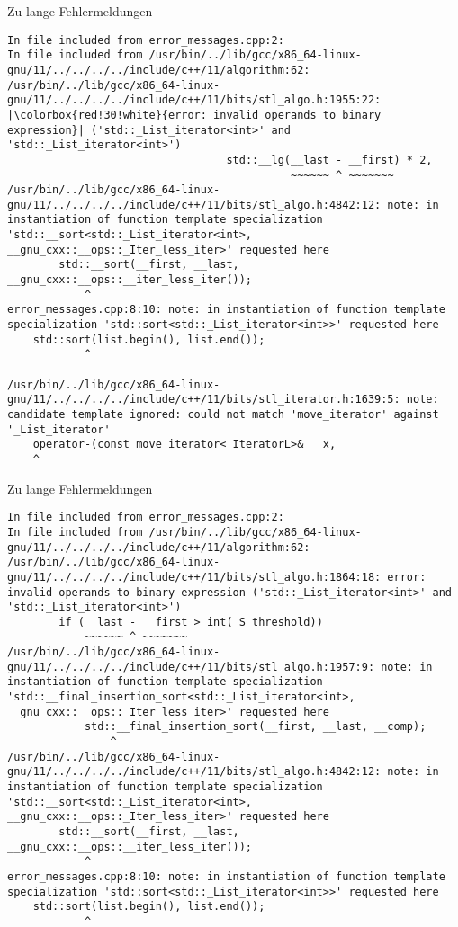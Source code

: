 \setlength{\fboxsep}{0.1pt}
\begin{frame}[fragile]{Zu lange Fehlermeldungen}
    \begin{verbatim}
In file included from error_messages.cpp:2:
In file included from /usr/bin/../lib/gcc/x86_64-linux-gnu/11/../../../../include/c++/11/algorithm:62:
/usr/bin/../lib/gcc/x86_64-linux-gnu/11/../../../../include/c++/11/bits/stl_algo.h:1955:22:
|\colorbox{red!30!white}{error: invalid operands to binary expression}| ('std::_List_iterator<int>' and 'std::_List_iterator<int>')
                                  std::__lg(__last - __first) * 2,
                                            ~~~~~~ ^ ~~~~~~~
/usr/bin/../lib/gcc/x86_64-linux-gnu/11/../../../../include/c++/11/bits/stl_algo.h:4842:12: note: in instantiation of function template specialization 'std::__sort<std::_List_iterator<int>, __gnu_cxx::__ops::_Iter_less_iter>' requested here
        std::__sort(__first, __last, __gnu_cxx::__ops::__iter_less_iter());
            ^
error_messages.cpp:8:10: note: in instantiation of function template specialization 'std::sort<std::_List_iterator<int>>' requested here
    std::sort(list.begin(), list.end());
            ^

/usr/bin/../lib/gcc/x86_64-linux-gnu/11/../../../../include/c++/11/bits/stl_iterator.h:1639:5: note: candidate template ignored: could not match 'move_iterator' against '_List_iterator'
    operator-(const move_iterator<_IteratorL>& __x,
    ^
    \end{verbatim}
\end{frame}

\begin{frame}[fragile]{Zu lange Fehlermeldungen}
    \begin{verbatim}
In file included from error_messages.cpp:2:
In file included from /usr/bin/../lib/gcc/x86_64-linux-gnu/11/../../../../include/c++/11/algorithm:62:
/usr/bin/../lib/gcc/x86_64-linux-gnu/11/../../../../include/c++/11/bits/stl_algo.h:1864:18: error: invalid operands to binary expression ('std::_List_iterator<int>' and 'std::_List_iterator<int>')
        if (__last - __first > int(_S_threshold))
            ~~~~~~ ^ ~~~~~~~
/usr/bin/../lib/gcc/x86_64-linux-gnu/11/../../../../include/c++/11/bits/stl_algo.h:1957:9: note: in instantiation of function template specialization 'std::__final_insertion_sort<std::_List_iterator<int>, __gnu_cxx::__ops::_Iter_less_iter>' requested here
            std::__final_insertion_sort(__first, __last, __comp);
                ^
/usr/bin/../lib/gcc/x86_64-linux-gnu/11/../../../../include/c++/11/bits/stl_algo.h:4842:12: note: in instantiation of function template specialization 'std::__sort<std::_List_iterator<int>, __gnu_cxx::__ops::_Iter_less_iter>' requested here
        std::__sort(__first, __last, __gnu_cxx::__ops::__iter_less_iter());
            ^
error_messages.cpp:8:10: note: in instantiation of function template specialization 'std::sort<std::_List_iterator<int>>' requested here
    std::sort(list.begin(), list.end());
            ^
    \end{verbatim}
\end{frame}

